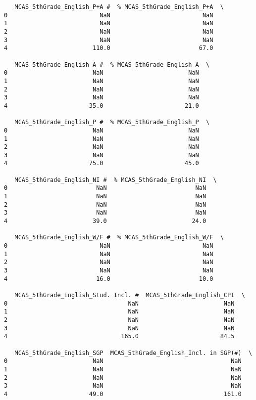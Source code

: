 \documentclass[11pt]{article}
\begin{document}
\begin{verbatim}
   MCAS_5thGrade_English_P+A #  % MCAS_5thGrade_English_P+A  \
0                          NaN                          NaN   
1                          NaN                          NaN   
2                          NaN                          NaN   
3                          NaN                          NaN   
4                        110.0                         67.0   

   MCAS_5thGrade_English_A #  % MCAS_5thGrade_English_A  \
0                        NaN                        NaN   
1                        NaN                        NaN   
2                        NaN                        NaN   
3                        NaN                        NaN   
4                       35.0                       21.0   

   MCAS_5thGrade_English_P #  % MCAS_5thGrade_English_P  \
0                        NaN                        NaN   
1                        NaN                        NaN   
2                        NaN                        NaN   
3                        NaN                        NaN   
4                       75.0                       45.0   

   MCAS_5thGrade_English_NI #  % MCAS_5thGrade_English_NI  \
0                         NaN                         NaN   
1                         NaN                         NaN   
2                         NaN                         NaN   
3                         NaN                         NaN   
4                        39.0                        24.0   

   MCAS_5thGrade_English_W/F #  % MCAS_5thGrade_English_W/F  \
0                          NaN                          NaN   
1                          NaN                          NaN   
2                          NaN                          NaN   
3                          NaN                          NaN   
4                         16.0                         10.0   

   MCAS_5thGrade_English_Stud. Incl. #  MCAS_5thGrade_English_CPI  \
0                                  NaN                        NaN   
1                                  NaN                        NaN   
2                                  NaN                        NaN   
3                                  NaN                        NaN   
4                                165.0                       84.5   

   MCAS_5thGrade_English_SGP  MCAS_5thGrade_English_Incl. in SGP(#)  \
0                        NaN                                    NaN   
1                        NaN                                    NaN   
2                        NaN                                    NaN   
3                        NaN                                    NaN   
4                       49.0                                  161.0   


\end{verbatim}
\end{document}
